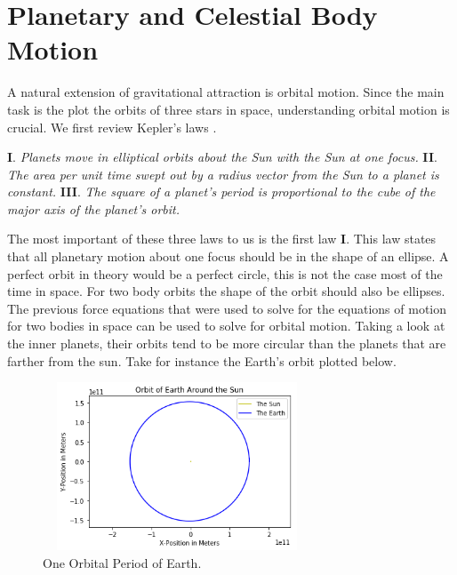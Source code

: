 \documentclass[twocolumn]{article}
\begin{document}
\section{Planetary and Celestial Body Motion}
A natural extension of gravitational attraction is orbital motion. Since the main task is the plot the orbits of three stars in space, understanding orbital motion is crucial. We first review Kepler's laws \cite{Marion}.
\begin{center}
\textbf{I}. \small{\textit{Planets move in elliptical orbits about the Sun with the Sun at one focus.}} \newline
\textbf{II}. \small{\textit{The area per unit time swept out by a radius vector from the Sun to a planet is constant.}} \newline
\textbf{III}. \small{\textit{The square of a planet's period is proportional to the cube of the major axis of the planet's orbit.}} \newline
\end{center}
The most important of these three laws to us is the first law \textbf{I}. This law states that all planetary motion about one focus should be in the shape of an ellipse. A perfect orbit in theory would be a perfect circle, this is not the case most of the time in space. For two body orbits the shape of the orbit should also be ellipses. The previous force equations that were used to solve for the equations of motion for two bodies in space can be used to solve for orbital motion. Taking a look at the inner planets, their orbits tend to be more circular than the planets that are farther from the sun. Take for instance the Earth's orbit plotted below.
\newpage
\begin{figure}[ht]
    \centering
    \includegraphics[width=8cm, height=5cm]{Figures/Earth Orbit.png}
    \caption{\small{One Orbital Period of Earth.}}
    \label{Fig. Earth Orbit}
\end{figure}
\end{document}
